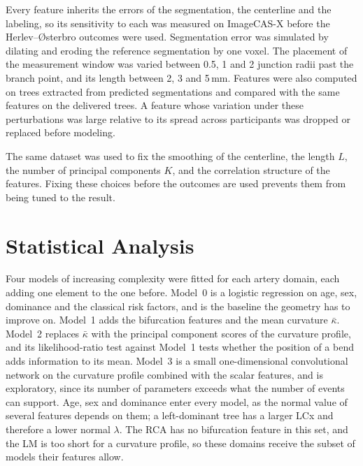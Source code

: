 Every feature inherits the errors of the segmentation, the centerline and the labeling, so its
sensitivity to each was measured on ImageCAS-X before the Herlev--{\O}sterbro outcomes were used.
Segmentation error was simulated by dilating and eroding the reference segmentation by one voxel.
The placement of the measurement window was varied between 0.5, 1 and 2 junction radii past the
branch point, and its length between 2, 3 and 5\,mm.
Features were also computed on trees extracted from predicted segmentations and compared with the
same features on the delivered trees.
A feature whose variation under these perturbations was large relative to its spread across
participants was dropped or replaced before modeling.

The same dataset was used to fix the smoothing of the centerline, the length $L$, the number of
principal components $K$, and the correlation structure of the features.
Fixing these choices before the outcomes are used prevents them from being tuned to the result.


\section{Statistical Analysis}
\label{sec:method-statistics}

Four models of increasing complexity were fitted for each artery domain, each adding one element to
the one before.
Model~0 is a logistic regression on age, sex, dominance and the classical risk factors, and is the
baseline the geometry has to improve on.
Model~1 adds the bifurcation features and the mean curvature $\bar\kappa$.
Model~2 replaces $\bar\kappa$ with the principal component scores of the curvature profile, and its
likelihood-ratio test against Model~1 tests whether the position of a bend adds information to
its mean.
Model~3 is a small one-dimensional convolutional network on the curvature profile combined with
the scalar features, and is exploratory, since its number of parameters exceeds what the number of
events can support.
Age, sex and dominance enter every model, as the normal value of several features depends on
them; a left-dominant tree has a larger LCx and therefore a lower normal $\lambda$.
The RCA has no bifurcation feature in this set, and the LM is too short for a curvature profile,
so these domains receive the subset of models their features allow.

